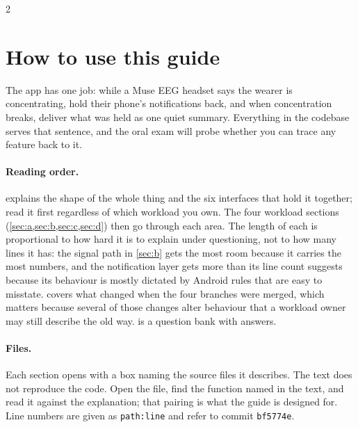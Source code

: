 \documentclass[10pt,a4paper]{article}
\newcommand{\code}[1]{\texttt{#1}}                  %
\begin{document}
\begin{multicols}{2}\small\tableofcontents\end{multicols}
\clearpage
\section{How to use this guide}

The app has one job: while a Muse EEG headset says the wearer is concentrating, hold their
phone's notifications back, and when concentration breaks, deliver what was held as one quiet
summary. Everything in the codebase serves that sentence, and the oral exam will probe whether
you can trace any feature back to it.

\paragraph{Reading order.}  explains the shape of the whole thing and the
six interfaces that hold it together; read it first regardless of which workload you own. The
four workload sections (\cref{sec:a,sec:b,sec:c,sec:d}) then go through each area. The length of
each is proportional to how hard it is to explain under questioning, not to how many lines it has:
the signal path in \cref{sec:b} gets the most room because it carries the most numbers, and
the notification layer gets more than its line count suggests because its behaviour is mostly
dictated by Android rules that are easy to misstate.  covers what changed
when the four branches were merged, which matters because several of those changes alter
behaviour that a workload owner may still describe the old way.  is a question
bank with answers.

\paragraph{Files.} Each section opens with a box naming the source files it describes. The text
does not reproduce the code. Open the file, find the function named in the text, and read it
against the explanation; that pairing is what the guide is designed for. Line numbers are given
as \code{path:line} and refer to commit \code{bf5774e}.
\end{document}
